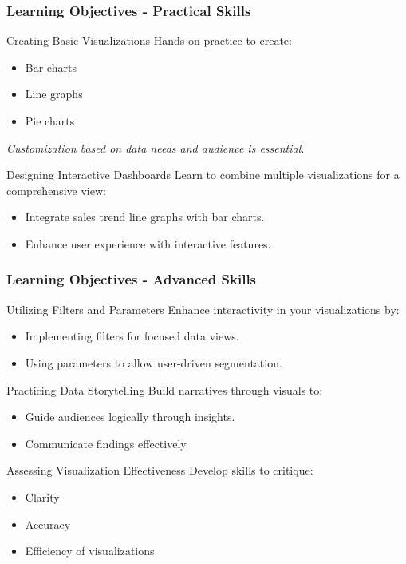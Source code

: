 \documentclass[aspectratio=169]{beamer}
\begin{document}
\begin{frame}[fragile]
    \frametitle{Learning Objectives - Practical Skills}
    \begin{block}{Creating Basic Visualizations}
        Hands-on practice to create:
        \begin{itemize}
            \item Bar charts
            \item Line graphs
            \item Pie charts
        \end{itemize}
        \textit{Customization based on data needs and audience is essential.}
    \end{block}
    
    \begin{block}{Designing Interactive Dashboards}
        Learn to combine multiple visualizations for a comprehensive view:
        \begin{itemize}
            \item Integrate sales trend line graphs with bar charts.
            \item Enhance user experience with interactive features.
        \end{itemize}
    \end{block}
\end{frame}

\begin{frame}[fragile]
    \frametitle{Learning Objectives - Advanced Skills}
    \begin{block}{Utilizing Filters and Parameters}
        Enhance interactivity in your visualizations by:
        \begin{itemize}
            \item Implementing filters for focused data views.
            \item Using parameters to allow user-driven segmentation.
        \end{itemize}
    \end{block}
    
    \begin{block}{Practicing Data Storytelling}
        Build narratives through visuals to:
        \begin{itemize}
            \item Guide audiences logically through insights.
            \item Communicate findings effectively.
        \end{itemize}
    \end{block}
    
    \begin{block}{Assessing Visualization Effectiveness}
        Develop skills to critique:
        \begin{itemize}
            \item Clarity
            \item Accuracy
            \item Efficiency of visualizations
        \end{itemize}
    \end{block}
\end{frame}
\end{document}

